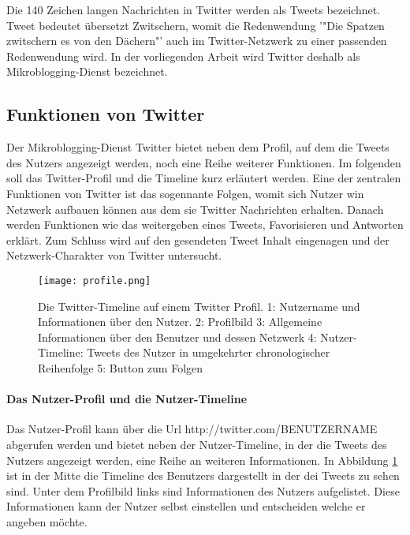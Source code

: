 			Die 140 Zeichen langen Nachrichten in Twitter werden als Tweets bezeichnet.
			Tweet bedeutet übersetzt Zwitschern, womit die Redenwendung '"Die Spatzen zwitschern es von den Dächern"' auch im Twitter-Netzwerk zu einer passenden Redenwendung  wird.  
			In der vorliegenden Arbeit wird Twitter deshalb als Mikroblogging-Dienst bezeichnet.
		
			\subsection{Funktionen von Twitter}
			Der Mikroblogging-Dienst Twitter bietet neben dem Profil, auf dem die Tweets des Nutzers angezeigt werden, noch eine Reihe weiterer Funktionen. 
			Im folgenden soll das Twitter-Profil und die Timeline kurz erläutert werden. 
			Eine der zentralen Funktionen von Twitter ist das sogennante Folgen, womit sich Nutzer win Netzwerk aufbauen können aus dem sie Twitter Nachrichten erhalten.
			Danach werden Funktionen wie das weitergeben eines Tweets, Favorisieren und Antworten erklärt. 
			Zum Schluss wird auf den gesendeten Tweet Inhalt eingenagen und der Netzwerk-Charakter von Twitter untersucht.

			\begin{figure}[h!]
			\begin{center}
			\texttt{[image: profile.png]}
			\caption{Die Twitter-Timeline auf einem Twitter Profil. 1: Nutzername und Informationen über den Nutzer. 2: Profilbild
			3: Allgemeine Informationen über den Benutzer und dessen Netzwerk
			4: Nutzer-Timeline: Tweets des Nutzer in umgekehrter chronologischer Reihenfolge 
			5: Button zum Folgen}
			\label{img:twitterProfile}
			\end{center}
			\end{figure}	


				\paragraph{Das Nutzer-Profil und die Nutzer-Timeline}
					Das Nutzer-Profil kann über die Url http://twitter.com/BENUTZERNAME abgerufen werden und bietet neben der Nutzer-Timeline, in der die Tweets des Nutzers angezeigt werden, eine Reihe an weiteren Informationen.
					In Abbildung \ref{img:twitterProfile} ist in der Mitte die Timeline des Benutzers dargestellt in der dei Tweets zu sehen sind. 
					Unter dem Profilbild links sind Informationen des Nutzers aufgelistet.
					Diese Informationen kann der Nutzer selbst einstellen und entscheiden welche er angeben möchte.   


